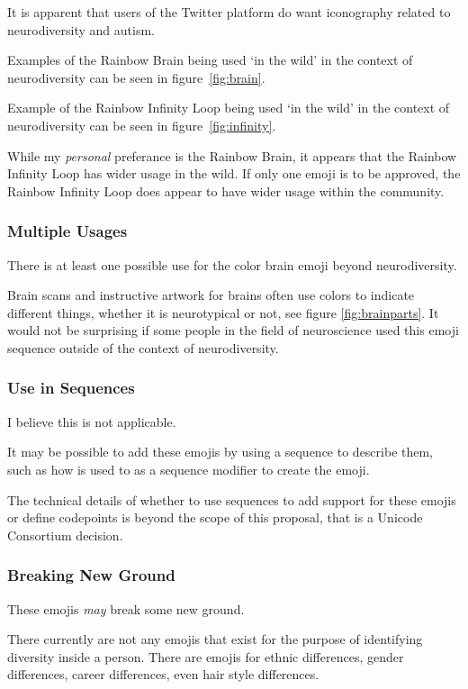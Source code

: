 It is apparent that users of the Twitter platform do want iconography related to neurodiversity
and autism.

Examples of the Rainbow Brain being used `in the wild' in the context of neurodiversity can be
seen in figure~\ref{fig:brain}.

Example of the Rainbow Infinity Loop being used `in the wild' in the context of neurodiversity
can be seen in figure~\ref{fig:infinity}.

While my \emph{personal} preferance is the Rainbow Brain, it appears that the Rainbow
Infinity Loop has wider usage in the wild. If only one emoji is to be approved, the Rainbow
Infinity Loop does appear to have wider usage within the community.


\subsubsection{Multiple Usages}

There is at least one possible use for the color brain emoji beyond neurodiversity.

Brain scans and instructive artwork for brains often use colors to indicate different things,
whether it is neurotypical or not, see figure \ref{fig:brainparts}. It would not be surprising
if some people in the field of neuroscience used this emoji sequence outside of the context
of neurodiversity.


\subsubsection{Use in Sequences}

I believe this is not applicable.

It may be possible to add these emojis by using a sequence to describe them, such as how
\rainbow{} is used to as a sequence modifier to create the
\prideflag{} emoji.

The technical details of whether to use sequences to add support for these emojis or define
codepoints is beyond the scope of this proposal, that is a Unicode Consortium decision.

\subsubsection{Breaking New Ground}

These emojis \emph{may} break some new ground.

There currently are not any emojis that exist for the purpose of identifying diversity inside
a person. There are emojis for ethnic differences, gender differences, career differences,
even hair style differences.

